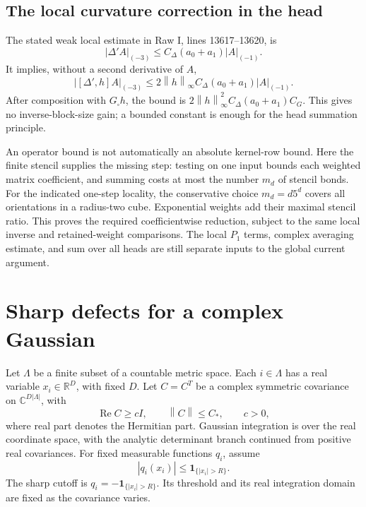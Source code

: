 \documentclass[11pt]{article}
\theoremstyle{remark}
\newcommand{\R}{\mathbb R}
\newcommand{\C}{\mathbb C}
\newcommand{\Rea}{\operatorname{Re}}
\newcommand{\norm}[1]{\left\|#1\right\|}
\begin{document}
\subsection{The local curvature correction in the head}

The stated weak local estimate in Raw I, lines 13617--13620, is
\[
 |\Delta'A|_{(-3)}\le C_\Delta(a_0+a_1)|A|_{(-1)}.
\]
It implies, without a second derivative of $A$,
\[
 |[\Delta',h]A|_{(-3)}
 \le2\norm h_\infty C_\Delta(a_0+a_1)|A|_{(-1)}.
\]
After composition with $G_\square h$, the bound is
$2\norm h_\infty^2 C_\Delta(a_0+a_1)C_G$.
This gives no inverse-block-size gain; a bounded constant is enough
for the head summation principle.

An operator bound is not automatically an absolute kernel-row bound.
Here the finite stencil supplies the missing step: testing on one
input bounds each weighted matrix coefficient, and summing costs
at most the number $m_d$ of stencil bonds. For the indicated one-step
locality, the conservative choice $m_d=d5^d$ covers all orientations
in a radius-two cube. Exponential weights add their maximal stencil
ratio. This proves the required coefficientwise reduction, subject
to the same local inverse and retained-weight comparisons. The local
$P_1$ terms, complex averaging estimate, and sum over all heads are
still separate inputs to the global current argument.

\section{Sharp defects for a complex Gaussian}

Let $\Lambda$ be a finite subset of a countable metric space. Each
$i\in\Lambda$ has a real variable $x_i\in\R^D$, with fixed $D$.
Let $C=C^T$ be a complex symmetric covariance on
$\C^{D|\Lambda|}$, with
\begin{equation}\label{eq:cov-assumptions}
 \Rea C\ge cI,\qquad \norm C\le C_*,\qquad c>0,
\end{equation}
where real part denotes the Hermitian part. Gaussian integration is
over the real coordinate space, with the analytic determinant branch
continued from positive real covariances. For fixed measurable
functions $q_i$, assume
\begin{equation}\label{eq:defect}
 |q_i(x_i)|\le\mathbf1_{\{|x_i|>R\}}.
\end{equation}
The sharp cutoff is $q_i=-\mathbf1_{\{|x_i|>R\}}$. Its threshold and
its real integration domain are fixed as the covariance varies.
\end{document}

